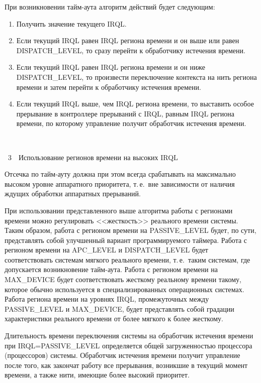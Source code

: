 \begin{multicols}{2}
   При возникновении тайм-аута алгоритм дейст\-вий будет сле\-ду\-ющим:
   \begin{enumerate}[1.]
\item Получить значение текущего IRQL.
\item Если текущий IRQL равен IRQL региона времени и он выше или равен
DISPATCH\_LEVEL, то сразу перейти к обработчику истечения времени.
\item Если текущий IRQL равен IRQL региона времени и он ниже DISPATCH\_LEVEL, то
произвести переключение контекста на нить региона времени и затем перейти к
обработчику истечения времени.
\item Если текущий IRQL выше, чем IRQL региона времени, то выставить особое
прерывание в контроллере прерываний с IRQL, равным IRQL региона времени, по
которому управление получит обработчик истечения времени.
\end{enumerate}

\begin{center}
\vspace*{6pt}
\mbox{%
\epsfxsize=76.392mm
}
\end{center}
\vspace*{1pt}
{{\figurename~3}\ \ \small{Использование регионов времени на высоких IRQL}}
\addtocounter{figure}{1}  

   Отсечка по тайм-ауту должна при этом всегда срабатывать на максимально высоком уровне
аппаратного приоритета, т.\,е.\ вне зависимости от наличия ждущих обработки аппаратных
прерываний.

   При использовании представленного выше алгоритма работы с регионами времени можно
регулировать <<жесткость>> реального времени системы. Таким образом, работа с регионом времени на
\mbox{PASSIVE\_LEVEL} будет, по сути, представлять собой улучшенный вариант программируемого
таймера. Работа с регионом времени на APC\_LEVEL и DISPATCH\_LEVEL будет
соответствовать системам мягкого реального времени, т.\,е.\ таким системам, где допускается
возникновение тайм-аута. Работа с регионом времени на MAX\_DEVICE будет соответствовать
жесткому реальному времени такому, которое обычно используется в специализированных
операционных системах. Работа региона времени на уровнях IRQL, промежуточных между
\mbox{PASSIVE\_LEVEL} и MAX\_DEVICE, будет представлять собой градации характеристики
реального времени от более мягкого к более жесткому.

   Длительность времени переключения системы на обработчик истечения времени при
IRQL\;=\;PASSIVE\_LEVEL определяется общей загруженностью процессора (процессоров)
системы. Обработчик истечения времени получит управление после того, как закончат работу все
прерывания, возникшие в текущий момент времени, а также нити, имеющие более высокий
приоритет.


\end{multicols}
